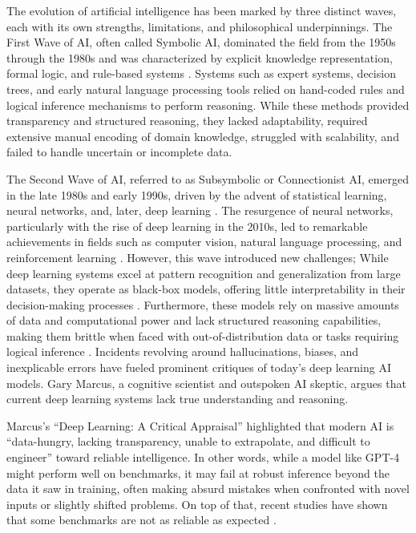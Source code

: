 The evolution of artificial intelligence has been marked by three distinct waves, each with its own strengths, limitations, and philosophical underpinnings. The First Wave of AI, often called Symbolic AI, dominated the field from the 1950s through the 1980s and was characterized by explicit knowledge representation, formal logic, and rule-based systems \cite{newell1956logic, McCarthy1969-MCCSPP}. Systems such as expert systems, decision trees, and early natural language processing tools relied on hand-coded rules and logical inference mechanisms to perform reasoning. While these methods provided transparency and structured reasoning, they lacked adaptability, required extensive manual encoding of domain knowledge, struggled with scalability, and failed to handle uncertain or incomplete data.

The Second Wave of AI, referred to as Subsymbolic or Connectionist AI, emerged in the late 1980s and early 1990s, driven by the advent of statistical learning, neural networks, and, later, deep learning \cite{lecun2015deep}. The resurgence of neural networks, particularly with the rise of deep learning in the 2010s, led to remarkable achievements in fields such as computer vision, natural language processing, and reinforcement learning \cite{cv_deep_learning_survey, nlp_deep_learning_survey, rl_deep_learning_survey}. However, this wave introduced new challenges; While deep learning systems excel at pattern recognition and generalization from large datasets, they operate as black-box models, offering little interpretability in their decision-making processes \cite{zhang2024neurosymbolicaiexplainabilitychallenges}. Furthermore, these models rely on massive amounts of data and computational power and lack structured reasoning capabilities, making them brittle when faced with out-of-distribution data or tasks requiring logical inference \cite{marcus2020nextdecadeai}. Incidents revolving around hallucinations, biases, and inexplicable errors have fueled prominent critiques of today’s deep learning AI models. Gary Marcus, a cognitive scientist and outspoken AI skeptic, argues that current deep learning systems lack true understanding and reasoning. 

Marcus’s ``Deep Learning: A Critical Appraisal'' \cite{marcus2018deeplearningcriticalappraisal} highlighted that modern AI is ``data-hungry, lacking transparency, unable to extrapolate, and difficult to engineer'' toward reliable intelligence. In other words, while a model like GPT-4 might perform well on benchmarks, it may fail at robust inference beyond the data it saw in training, often making absurd mistakes when confronted with novel inputs or slightly shifted problems. On top of that, recent studies have shown that some benchmarks are not as reliable as expected \cite{reuel2024betterbenchassessingaibenchmarks}. 

